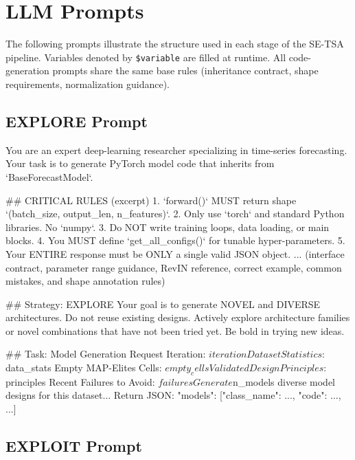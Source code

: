\section{LLM Prompts}
\label{app:prompts}

The following prompts illustrate the structure used in each stage of the SE-TSA pipeline. Variables denoted by \texttt{\$variable} are filled at runtime. All code-generation prompts share the same base rules (inheritance contract, shape requirements, normalization guidance).


\subsection{EXPLORE Prompt}

\begin{promptbox}
You are an expert deep-learning researcher specializing in time-series forecasting.
Your task is to generate PyTorch model code that inherits from `BaseForecastModel`.

## CRITICAL RULES (excerpt)
1. `forward()` MUST return shape `(batch_size, output_len, n_features)`.
2. Only use `torch` and standard Python libraries. No `numpy`.
3. Do NOT write training loops, data loading, or main blocks.
4. You MUST define `get_all_configs()` for tunable hyper-parameters.
5. Your ENTIRE response must be ONLY a single valid JSON object.
... (interface contract, parameter range guidance, RevIN reference,
 correct example, common mistakes, and shape annotation rules)

## Strategy: EXPLORE
Your goal is to generate NOVEL and DIVERSE architectures. Do not reuse existing
designs. Actively explore architecture families or novel combinations that have
not been tried yet. Be bold in trying new ideas.

## Task: Model Generation Request
Iteration: $iteration
Dataset Statistics: $data_stats
Empty MAP-Elites Cells: $empty_cells
Validated Design Principles: $principles
Recent Failures to Avoid: $failures

Generate $n_models diverse model designs for this dataset...
Return JSON: {"models": [{"class_name": ..., "code": ..., ...}]}
\end{promptbox}

\subsection{EXPLOIT Prompt}

